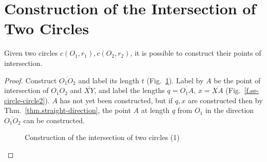 \section{Construction of the Intersection of Two Circles}\label{s.two-circles}

\begin{theorem}
Given two circles $c(O_1,r_1), c(O_2,r_2)$, it is possible to construct their points of intersection.
\end{theorem}

\begin{proof}
Construct $\overline{O_1O_2}$ and label its length $t$ (Fig.~\ref{f.se-circle-circle1}).
Label by $A$ be the point of intersection of $\overline{O_1O_2}$ and $\overline{XY}$, and label the lengths $q=\overline{O_1A}$, $x=\overline{XA}$ (Fig.~\ref{f.se-circle-circle2}). $A$ has not yet been constructed, but if $q,x$ are constructed then by Thm.~\ref{thm.straight-direction}, the point $A$ at length $q$ from $O_1$ in the direction $\overline{O_1O_2}$ can be constructed.

\begin{figure}[b]
\begin{center}
\end{center}
\caption{Construction of the intersection of two circles (1)}\label{f.se-circle-circle1}
\end{figure}


\end{proof}
